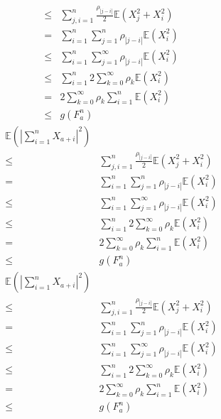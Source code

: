 \documentclass{ctexart}
\begin{document}
\begin{remark}
\begin{equation}
\begin{aligned}
      \leq & \sum_{j,i = 1}^{n} \frac{\rho_{|j-i|}}{2}\mathbb{E}(X_j^2 + X_i^2)\\
      =& \sum_{i=1}^{n} \sum_{j=1}^{n}\rho_{|j-i|}\mathbb{E}(X_i^2)\\
      \leq & \sum_{i=1}^{n} \sum_{j=1}^{\infty} \rho_{|j-i|}\mathbb{E}(X_i^2)\\
      \leq & \sum_{i=1}^{n} 2\sum_{k=0}^{\infty} \rho_k \mathbb{E}(X_i^2)\\
      =& 2\sum_{k=0}^{\infty}\rho_k  \sum_{i=1}^{n}\mathbb{E}(X_i^2)\\
      \leq & g(F_a^n)
    \end{aligned}
  \end{equation}
  \begin{equation}
    \begin{aligned}
      \mathbb{E}(|\sum_{i=1}^{n}X_{a+i}|^2) \\
      \leq & \sum_{j,i = 1}^{n} \frac{\rho_{|j-i|}}{2}\mathbb{E}(X_j^2 + X_i^2)\\
      =& \sum_{i=1}^{n} \sum_{j=1}^{n}\rho_{|j-i|}\mathbb{E}(X_i^2)\\
      \leq & \sum_{i=1}^{n} \sum_{j=1}^{\infty} \rho_{|j-i|}\mathbb{E}(X_i^2)\\
      \leq & \sum_{i=1}^{n} 2\sum_{k=0}^{\infty} \rho_k \mathbb{E}(X_i^2)\\
      =& 2\sum_{k=0}^{\infty}\rho_k  \sum_{i=1}^{n}\mathbb{E}(X_i^2)\\
      \leq & g(F_a^n)
    \end{aligned}
  \end{equation}
  \begin{equation}
    \begin{aligned}
      \mathbb{E}(|\sum_{i=1}^{n}X_{a+i}|^2) \\
      \leq & \sum_{j,i = 1}^{n} \frac{\rho_{|j-i|}}{2}\mathbb{E}(X_j^2 + X_i^2)\\
      =& \sum_{i=1}^{n} \sum_{j=1}^{n}\rho_{|j-i|}\mathbb{E}(X_i^2)\\
      \leq & \sum_{i=1}^{n} \sum_{j=1}^{\infty} \rho_{|j-i|}\mathbb{E}(X_i^2)\\
      \leq & \sum_{i=1}^{n} 2\sum_{k=0}^{\infty} \rho_k \mathbb{E}(X_i^2)\\
      =& 2\sum_{k=0}^{\infty}\rho_k  \sum_{i=1}^{n}\mathbb{E}(X_i^2)\\
      \leq & g(F_a^n)
    \end{aligned}
  \end{equation}
  \begin{equation}

\end{equation}
\end{remark}
\end{document}
